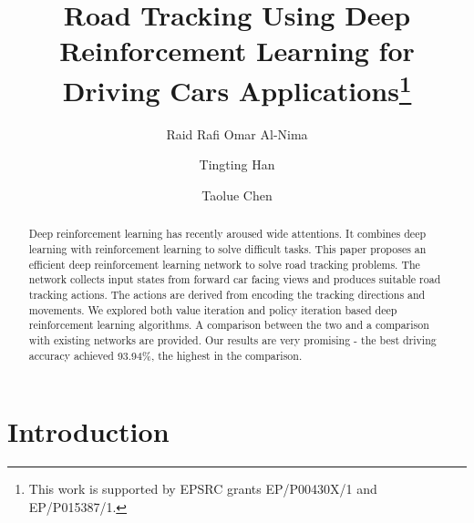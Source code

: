 \documentclass{svproc}
\begin{document}
\mainmatter              %
%
\title{Road Tracking Using Deep Reinforcement Learning for Driving Cars Applications\thanks{This work is supported by EPSRC grants EP/P00430X/1 and EP/P015387/1.}}
%
%
\author{Raid Rafi Omar Al-Nima \and Tingting Han \and 
	Taolue Chen}
%
%
%

\maketitle              %

\begin{abstract}
Deep reinforcement learning has recently aroused wide attentions. It combines deep learning with reinforcement learning to solve difficult tasks. This paper proposes an efficient deep reinforcement learning network to solve road tracking problems. The network collects input states from forward car facing views and produces suitable road tracking actions. The actions are derived from encoding the tracking directions and movements. We explored both value iteration and policy iteration based deep reinforcement learning algorithms. A comparison between the two and a comparison with existing networks are provided. Our results are very promising - the best driving accuracy achieved 93.94\%, the highest in the comparison. 
\end{abstract}


\section{Introduction}
\end{document}
